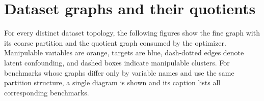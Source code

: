 \documentclass[twoside]{article}
\begin{document}
 
\section{Dataset graphs and their quotients}
\label{app:dags}
 For every distinct dataset topology, the following figures show the fine graph with its coarse partition and the quotient graph consumed by the optimizer. Manipulable variables are orange, targets are blue, dash-dotted edges denote latent confounding, and dashed boxes indicate manipulable clusters. For benchmarks whose graphs differ only by variable names and use the same partition structure, a single diagram is shown and its caption lists all corresponding benchmarks.
 
\begingroup
\let\savedfigure\figure
\let\endsavedfigure\endfigure
\renewenvironment{figure}[1][]{\savedfigure[H]}{\endsavedfigure}

\endgroup
\clearpage
\end{document}
